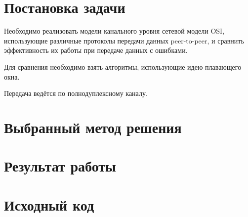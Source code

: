 \documentclass[a4paper,10pt]{article}
\begin{document}


\tableofcontents
\pagebreak


\section{Постановка задачи}
Необходимо реализовать модели канального уровня сетевой модели OSI, 
использующие различные протоколы передачи данных peer-to-peer, 
и сравнить эффективность их работы при передаче данных с ошибками.

Для сравнения необходимо взять алгоритмы, 
использующие идею плавающего окна.

Передача ведётся по полнодуплексному каналу.

\section{Выбранный метод решения}
\cite{tanenbaum2003compnet}

\subsection{}

\section{Результат работы}

\pagebreak

\appendix
\section{Исходный код}
\label{appendix-sources}

%


\pagebreak



\end{document}
